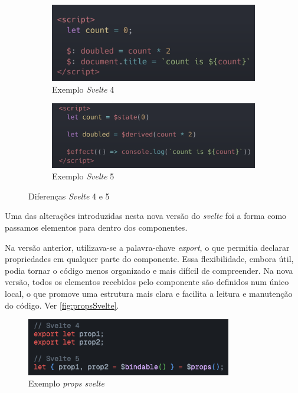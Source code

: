 \begin{figure}[!h]
	\centering
	\begin{subfigure}[c]{0.45\textwidth}
		\centering
		\includegraphics[width=\textwidth]{figs/svelte4.png}
		\caption{Exemplo \textit{Svelte} 4}
		\label{fig:svelte4}
	\end{subfigure}
	\hfill
	\begin{subfigure}[c]{0.45\textwidth}
		\centering
		\includegraphics[width=\textwidth]{figs/svelte5.png}
		\caption{Exemplo \textit{Svelte} 5}
		\label{fig:svelte5}
	\end{subfigure}
	\caption{Diferenças \textit{Svelte} 4 e 5}
\end{figure}

Uma das alterações introduzidas nesta nova versão do \textit{svelte} foi a forma como passamos elementos para dentro dos componentes. 

Na versão anterior, utilizava-se a palavra-chave \textit{export}, o que permitia declarar propriedades em qualquer parte do componente. Essa flexibilidade, embora útil, podia tornar o código menos organizado e mais difícil de compreender. Na nova versão, todos os elementos recebidos pelo componente são definidos num único local, o que promove uma estrutura mais clara e facilita a leitura e manutenção do código. Ver \autoref{fig:propsSvelte}.

\clearpage
\begin{figure}[h!]
    \centering
    \includegraphics[width=0.8\textwidth]{figs/props.png}
    \caption{Exemplo \textit{props svelte}}
    \label{fig:propsSvelte}
\end{figure}

